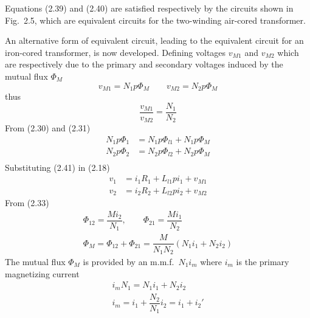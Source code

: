 \documentclass[a4paper,numbers=noenddot,12pt]{scrbook}
\begin{document}
                Equations (2.39) and (2.40) are satisfied respectively by the circuits shown in Fig.\ 2.5, which are equivalent circuits for the two-winding air-cored transformer.

                An alternative form of equivalent circuit, leading to the equivalent circuit for an iron-cored transformer, is now developed. Defining voltages $v_{M1}$ and $v_{M2}$ which are respectively due to the primary and secondary voltages induced by the mutual flux $\Phi_M$
                \begin{equation}
                    v_{M1} = N_1 p \Phi_M \qquad v_{M2} = N_2 p \Phi_M
                    \label{eq:Eq2.41}
                \end{equation}
                thus
                \begin{equation}
                    \dfrac{v_{M1}}{v_{M2}} = \dfrac{N_1}{N_2}
                    \label{eq:Eq2.42}
                \end{equation}
                From (2.30) and (2.31)
                \begin{align*}
                    N_1 p \Phi_1 & = N_1 p \Phi_{l1} + N_1 p \Phi_M \\
                    N_2 p \Phi_2 & = N_2 p \Phi_{l2} + N_2 p \Phi_M \\
                \end{align*}
                Substituting (2.41) in (2.18)
                \begin{equation}
                    \begin{aligned}
                        v_1 & = i_1 R_1 + L_{l1} p i_1 + v_{M1} \\
                        v_2 & = i_2 R_2 + L_{l2} p i_2 + v_{M2}
                    \end{aligned}
                    \label{eq:Eq2.43}
                \end{equation}
                From (2.33)
                \begin{gather}
                    \Phi_{12} = \dfrac{M i_2}{N_1}, \qquad \Phi_{21} = \dfrac{M i_1}{N_2} \nonumber \\
                    \Phi_M = \Phi_{12} + \Phi_{21} = \dfrac{M}{N_1 N_2} (N_1 i_1 + N_2 i_2)
                    \label{eq:Eq2.44}
                \end{gather}
                The mutual flux $\Phi_M$ is provided by an m.m.f.\ $N_1 i_m$ where $i_m$ is the primary magnetizing current
                \begin{gather}
                    i_m N_1 = N_1 i_1 + N_2 i_2 \nonumber\\
                    i_m = i_1 + \dfrac{N_2}{N_1} i_2 = i_1 + i_2'
                    \label{eq:Eq2.45}
                \end{gather}
\end{document}

